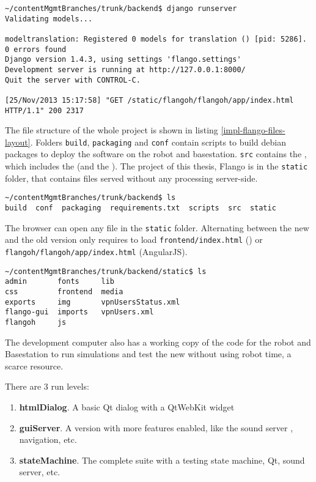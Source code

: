 \begin{lstlisting}[caption=Django web server, label=virtual-env-server]
~/contentMgmtBranches/trunk/backend$ django runserver
Validating models...

modeltranslation: Registered 0 models for translation () [pid: 5286].
0 errors found
Django version 1.4.3, using settings 'flango.settings'
Development server is running at http://127.0.0.1:8000/
Quit the server with CONTROL-C.

[25/Nov/2013 15:17:58] "GET /static/flangoh/flangoh/app/index.html HTTP/1.1" 200 2317
\end{lstlisting}

The file structure of the whole project is shown in listing \ref{impl-flango-files-layout}.
Folders \texttt{build}, \texttt{packaging} and \texttt{conf} contain scripts to build debian packages to deploy the software on the robot and basestation.
\texttt{src} contains the \flangobe , which includes the \flangofe (and the \se).
The project of this thesis, Flango \cm is in the \texttt{static} folder, that contains files served without any processing server-side.

\begin{lstlisting}[caption=Flango files layout, label=impl-flango-files-layout]
~/contentMgmtBranches/trunk/backend$ ls
build  conf  packaging  requirements.txt  scripts  src  static
\end{lstlisting}

The browser can open any file in the \texttt{static} folder.
Alternating between the new and the old version only requires to load \texttt{frontend/index.html} (\flash) or \texttt{flangoh/flangoh/app/index.html} (AngularJS).

\begin{lstlisting}[caption=Flango files layout, label=impl-flango-files-layout]
~/contentMgmtBranches/trunk/backend/static$ ls
admin       fonts     lib
css         frontend  media
exports     img       vpnUsersStatus.xml
flango-gui  imports   vpnUsers.xml
flangoh     js        
\end{lstlisting}

The development computer also has a working copy of the code for the robot and Basestation to run simulations and test the new \cm  without using robot time, a scarce resource.

There are 3 run levels:
\begin{enumerate}
\item \textbf{htmlDialog}. A basic Qt dialog with a QtWebKit widget
\item \textbf{guiServer}. A version with more features enabled, like the sound server , navigation, etc.
\item \textbf{stateMachine}. The complete suite with a testing state machine, Qt, sound server, etc.
\end{enumerate}

